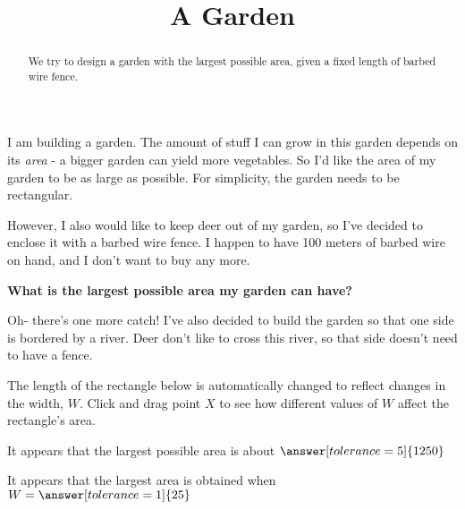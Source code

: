 \documentclass{ximera}
\title{A Garden}
\begin{document}
\begin{abstract}
We try to design a garden with the largest possible area, given a fixed length of barbed wire fence.
\end{abstract}

I am building a garden. The amount of stuff I can grow in this garden depends on its \emph{area} - a bigger garden can yield more vegetables. So I'd like the area of my garden to be as large as possible. For simplicity, the garden needs to be rectangular.

However, I also would like to keep deer out of my garden, so I've decided to enclose it with a barbed wire fence. I happen to have 100 meters of barbed wire on hand, and I don't want to buy any more.

\textbf{What is the largest possible area my garden can have?}

Oh- there's one more catch! I've also decided to build the garden so that one side is bordered by a river. Deer don't like to cross this river, so that side doesn't need to have a fence.

\begin{exploration}
The length of the rectangle below is automatically changed to reflect changes in the width, $W$. Click and drag point $X$ to see how different values of $W$ affect the rectangle's area.

\end{exploration}

\begin{problem}
It appears that the largest possible area is about $\answer[tolerance=5]{1250}$
\end{problem}

\begin{problem}
It appears that the largest area is obtained when $W = \answer[tolerance=1]{25}$
\end{problem}
\end{document}
